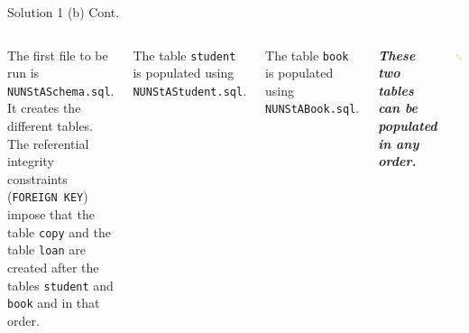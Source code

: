 \begin{frame}[fragile]{Solution 1 (b) Cont.}

\begin{columns}
The first file to be run is \texttt{NUNStASchema.sql}. It creates the different tables. The referential integrity constraints (\texttt{FOREIGN KEY}) impose that the table \texttt{copy} and the table \texttt{loan} are created after the tables \texttt{student} and \texttt{book} and in that order.\vspace{10pt}

The table \texttt{student} is populated using \texttt{NUNStAStudent.sql}. \vspace{10pt}

The table \texttt{book} is populated using \texttt{NUNStABook.sql}. \vspace{10pt}

\textbf{\textit{These two tables can be populated in any order.}} 

\includegraphics[width=\textwidth]{t1/images/t1-0.png}
\end{columns}
\end{frame}

